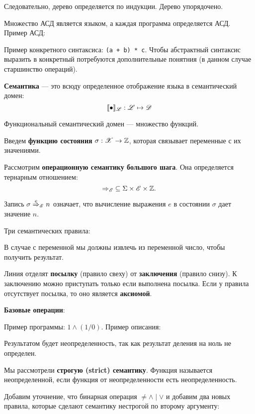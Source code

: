 Следовательно, дерево определяется по индукции. Дерево упорядочено.


Множество АСД является языком, а каждая программа определяется АСД. Пример АСД:


Пример конкретного синтаксиса: \texttt{(a + b) * c}. Чтобы абстрактный
синтаксис выразить в конкретный потребуются дополнительные понятния (в данном
случае старшинство операций).

\textbf{Семантика} --- это всюду определенное отображение языка в семантический
домен:
\[
    \llbracket \bullet \rrbracket_{\mathscr{L}} : \mathscr{L} \mapsto \mathscr{D}
\]

Функциональный семантический домен --- множество функций.

Введем \textbf{функцию состояния} $\sigma : \mathscr{X} \to \mathbb{Z}$,
которая связывает переменные с их значениями.

Рассмотрим \textbf{операционную семантику большого шага}. Она определяется тернарным
отношением:
\[
    \neatarrow_\Lexpr\; \subseteq \Sigma \times \Lexpr \times \mathbb{Z}.
\]

Запись $\sigma \overset{e}{\neatarrow}_\Lexpr n$ означает, что вычисление
выражения $e$ в состоянии $\sigma$ дает значение $n$.

Три семантических правила:


В случае с переменной мы должны извлечь из переменной число, чтобы получить
результат.

Линия отделят \textbf{посылку} (правило свеху) от \textbf{заключения} (правило снизу). К заключению можно
приступать только если выполнена посылка. Если у правила отсутствует посылка,
то оно является \textbf{аксиомой}. 

\textbf{Базовые операции}:


Пример программы: $1 \land (1 / 0)$. Пример описания:


Результатом будет неопределенность, так как результат деления на ноль не
определен.

Мы рассмотрели \textbf{строгую (strict) семантику}. Функция называется
неопределенной, если функция от неопределенности есть неопределенность.

Добавим уточнение, что бинарная операция $ \neq \land \mid \lor$ и
добавим два новых правила, которые сделают семантику нестрогой по второму аргументу:

